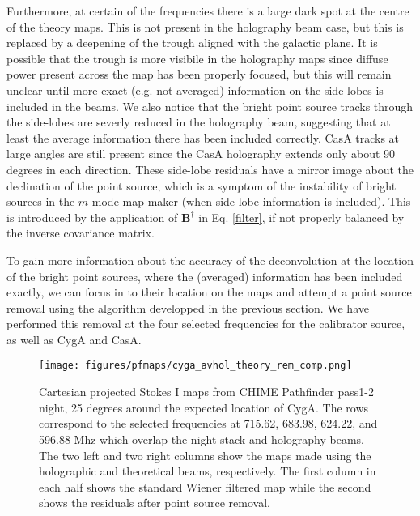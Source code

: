 Furthermore, at certain of the frequencies there is a large dark spot at the centre of the theory maps. This is not present in the holography beam case, but this is replaced by a deepening of the trough aligned with the galactic plane. It is possible that the trough is more visibile in the holography maps since diffuse power present across the map has been properly focused, but this will remain unclear until more exact (e.g. not averaged) information on the side-lobes is included in the beams. We also notice that the bright point source tracks through the side-lobes are severly reduced in the holography beam, suggesting that at least the average information there has been included correctly. CasA tracks at large angles are still present since the CasA holography extends only about 90 degrees in each direction. These side-lobe residuals have a mirror image about the declination of the point source, which is a symptom of the instability of bright sources in the $m$-mode map maker (when side-lobe information is included). This is introduced by the application of $\mathbf{B}^\dagger$ in Eq. \ref{filter}, if not properly balanced by the inverse covariance matrix.

To gain more information about the accuracy of the deconvolution at the location of the bright point sources, where the (averaged) information has been included exactly, we can focus in to their location on the maps and attempt a point source removal using the algorithm developped in the previous section. We have performed this removal at the four selected frequencies for the calibrator source, as well as CygA and CasA.

\begin{figure}
\centering
\texttt{[image: figures/pfmaps/cyga\_avhol\_theory\_rem\_comp.png]}
\caption{Cartesian projected Stokes I maps from CHIME Pathfinder pass1-2 night, 25 degrees around the expected location of CygA. The rows correspond to the selected frequencies at 715.62, 683.98, 624.22, and 596.88 Mhz which overlap the night stack and holography beams. The two left and two right columns show the maps made using the holographic and theoretical beams, respectively. The first column in each half shows the standard Wiener filtered map while the second shows the residuals after point source removal.}
\label{cyga_comparison}
\end{figure}

